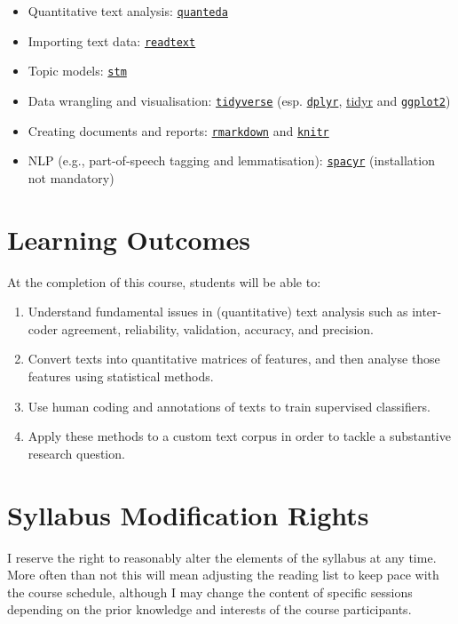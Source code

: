 \documentclass[abstract=on,parskip=full,headings=standardclasses,fontsize=11pt,paper=a4]{scrartcl}
\begin{document}
\begin{itemize}
\item Quantitative text analysis: \href{https://quanteda.io/}{\texttt{quanteda}}
\item Importing text data: \href{https://readtext.quanteda.io/}{\texttt{readtext}}
\item Topic models: \href{https://www.structuraltopicmodel.com/}{\texttt{stm}}
\item Data wrangling and visualisation: \href{https://www.tidyverse.org}{\texttt{tidyverse}} (esp. \href{https://dplyr.tidyverse.org}{\texttt{dplyr}}, \href{https://tidyr.tidyverse.org}{tidyr} and \href{https://ggplot2.tidyverse.org}{\texttt{ggplot2}})
\item Creating documents and reports: \href{https://rmarkdown.rstudio.com}{\texttt{rmarkdown}} and \href{https://yihui.name/knitr/}{\texttt{knitr}}
\item NLP (e.g., part-of-speech tagging and lemmatisation): \href{https://spacyr.quanteda.io}{\texttt{spacyr}} (installation not mandatory)
\end{itemize}

\section*{Learning Outcomes}

At the completion of this course, students will be able to:
\begin{enumerate}
\item Understand fundamental issues in (quantitative) text analysis such as inter-coder agreement, reliability, validation, accuracy, and precision.
\item Convert texts into quantitative matrices of features, and then analyse those features using statistical methods.
\item Use human coding and annotations of texts to train supervised classifiers.
\item  Apply these methods to a custom text corpus in order to tackle a substantive research question.
\end{enumerate}



\section*{Syllabus Modification Rights}

I reserve the right to reasonably alter the elements of the syllabus at any time. More often than not this will mean adjusting the reading list to keep pace with the course schedule, although I may change the content of specific sessions depending on the prior knowledge and interests of the course participants.
\end{document}
